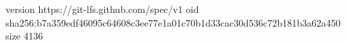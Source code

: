 version https://git-lfs.github.com/spec/v1
oid sha256:b7a359edf46095c64608c3ee77e1a01c70b1d33cac30d536c72b181b3a62a450
size 4136
